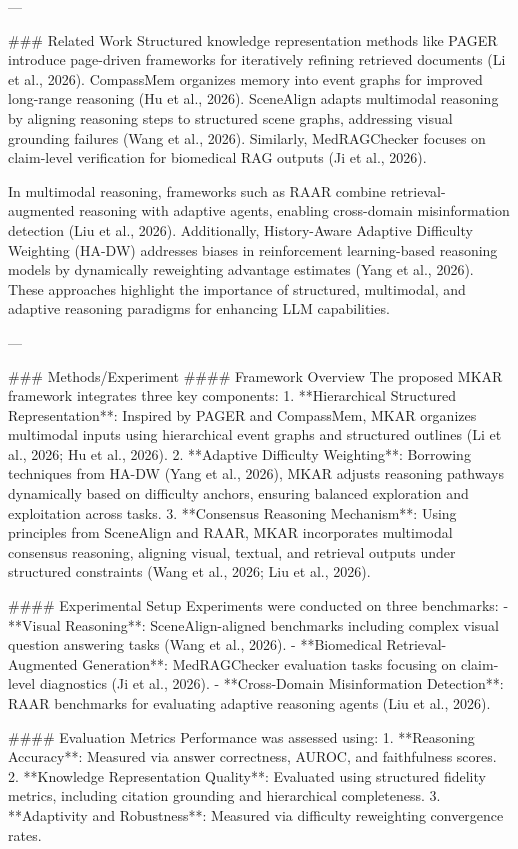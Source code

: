 ---

### Related Work
Structured knowledge representation methods like PAGER introduce page-driven frameworks for iteratively refining retrieved documents (Li et al., 2026). CompassMem organizes memory into event graphs for improved long-range reasoning (Hu et al., 2026). SceneAlign adapts multimodal reasoning by aligning reasoning steps to structured scene graphs, addressing visual grounding failures (Wang et al., 2026). Similarly, MedRAGChecker focuses on claim-level verification for biomedical RAG outputs (Ji et al., 2026).

In multimodal reasoning, frameworks such as RAAR combine retrieval-augmented reasoning with adaptive agents, enabling cross-domain misinformation detection (Liu et al., 2026). Additionally, History-Aware Adaptive Difficulty Weighting (HA-DW) addresses biases in reinforcement learning-based reasoning models by dynamically reweighting advantage estimates (Yang et al., 2026). These approaches highlight the importance of structured, multimodal, and adaptive reasoning paradigms for enhancing LLM capabilities.

---

### Methods/Experiment
#### Framework Overview
The proposed MKAR framework integrates three key components:
1. **Hierarchical Structured Representation**: Inspired by PAGER and CompassMem, MKAR organizes multimodal inputs using hierarchical event graphs and structured outlines (Li et al., 2026; Hu et al., 2026).
2. **Adaptive Difficulty Weighting**: Borrowing techniques from HA-DW (Yang et al., 2026), MKAR adjusts reasoning pathways dynamically based on difficulty anchors, ensuring balanced exploration and exploitation across tasks.
3. **Consensus Reasoning Mechanism**: Using principles from SceneAlign and RAAR, MKAR incorporates multimodal consensus reasoning, aligning visual, textual, and retrieval outputs under structured constraints (Wang et al., 2026; Liu et al., 2026).

#### Experimental Setup
Experiments were conducted on three benchmarks:
- **Visual Reasoning**: SceneAlign-aligned benchmarks including complex visual question answering tasks (Wang et al., 2026).
- **Biomedical Retrieval-Augmented Generation**: MedRAGChecker evaluation tasks focusing on claim-level diagnostics (Ji et al., 2026).
- **Cross-Domain Misinformation Detection**: RAAR benchmarks for evaluating adaptive reasoning agents (Liu et al., 2026).

#### Evaluation Metrics
Performance was assessed using:
1. **Reasoning Accuracy**: Measured via answer correctness, AUROC, and faithfulness scores.
2. **Knowledge Representation Quality**: Evaluated using structured fidelity metrics, including citation grounding and hierarchical completeness.
3. **Adaptivity and Robustness**: Measured via difficulty reweighting convergence rates.

